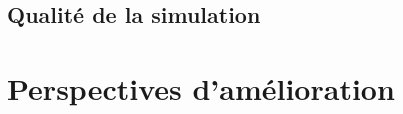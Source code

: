 \documentclass[12pt,a4paper,sans]{article}
\begin{document}
\subsection{Qualité de la simulation}



\section{Perspectives d'amélioration}
\end{document}
